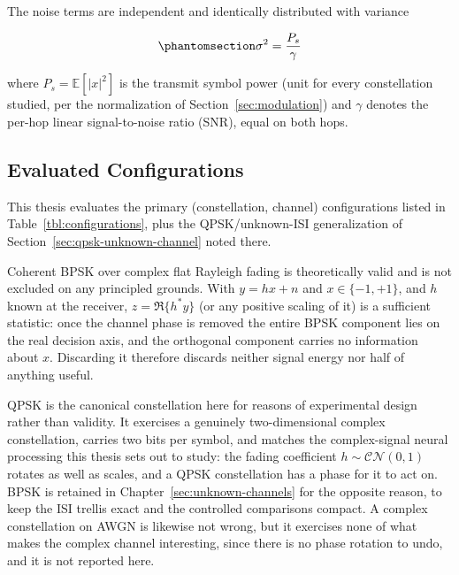 The noise terms are independent and identically distributed with variance

\begin{equation}\protect\phantomsection\label{eq:awgn-sigma2}
\sigma^2 = \frac{P_s}{\gamma}
\end{equation}

where \(P_s = \mathbb{E}[|x|^2]\) is the transmit symbol power (unit for every constellation studied, per the normalization of Section~\ref{sec:modulation}) and \(\gamma\) denotes the per-hop linear signal-to-noise ratio (SNR), equal on both hops.

\subsection{Evaluated Configurations}\label{sec:evaluated-configurations}

This thesis evaluates the primary (constellation, channel) configurations listed in Table~\ref{tbl:configurations}, plus the QPSK/unknown-ISI generalization of Section~\ref{sec:qpsk-unknown-channel} noted there.

Coherent BPSK over complex flat Rayleigh fading is theoretically valid and is not excluded on any principled grounds. With \(y = hx + n\) and \(x \in \{-1,+1\}\), and \(h\) known at the receiver, \(z = \Re\{h^{*}y\}\) (or any positive scaling of it) is a sufficient statistic: once the channel phase is removed the entire BPSK component lies on the real decision axis, and the orthogonal component carries no information about \(x\). Discarding it therefore discards neither signal energy nor half of anything useful.

QPSK is the canonical constellation here for reasons of experimental design rather than validity. It exercises a genuinely two-dimensional complex constellation, carries two bits per symbol, and matches the complex-signal neural processing this thesis sets out to study: the fading coefficient \(h \sim \mathcal{CN}(0,1)\) rotates as well as scales, and a QPSK constellation has a phase for it to act on. BPSK is retained in Chapter~\ref{sec:unknown-channels} for the opposite reason, to keep the ISI trellis exact and the controlled comparisons compact. A complex constellation on AWGN is likewise not wrong, but it exercises none of what makes the complex channel interesting, since there is no phase rotation to undo, and it is not reported here.

